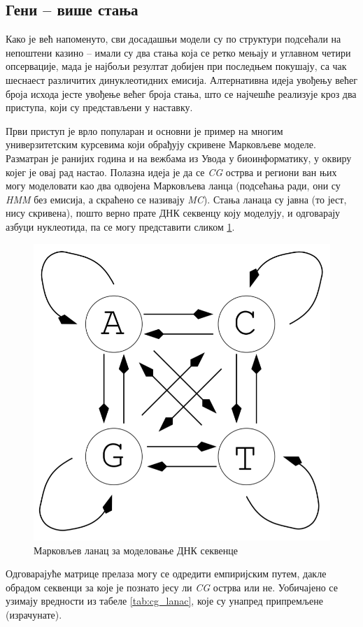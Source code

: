 \documentclass[12pt,oneside]{memoir}
\begin{document}
\begin{CJK}{UTF8}{ipxm}
\section{Гени -- више стања}
Како је већ напоменуто, сви досадашњи модели су по структури подсећали на непоштени казино -- имали су два стања која се ретко мењају и углавном четири опсервације, мада је најбољи резултат добијен при последњем покушају, са чак шеснаест различитих динуклеотидних емисија. Алтернативна идеја увођењу већег броја исхода јесте увођење већег броја стања, што се најчешће реализује кроз два приступа, који су представљени у наставку.

Први приступ је врло популаран и основни је пример на многим универзитетским курсевима који обрађују скривене Марковљеве моделе\cite{holmes2012, huson2020, kellis2021, shamir2009}. Разматран је ранијих година и на вежбама из Увода у биоинформатику, у оквиру којег је овај рад настао. Полазна идеја је да се \textit{CG} острва и региони ван њих могу моделовати као два одвојена Марковљева ланца (подсећања ради, они су \textit{HMM} без емисија, а скраћено се називају \textit{MC}). Стања ланаца су јавна (то јест, нису скривена), пошто верно прате ДНК секвенцу коју моделују, и одговарају азбуци нуклеотида, па се могу представити сликом \ref{fig:cg_lanac}.

\begin{figure}[H]
  \centering
  \includegraphics[width=.5\textwidth]{cg_lanac.png}
  \caption{Марковљев ланац за моделовање ДНК секвенце\cite{huson2020}}
  \label{fig:cg_lanac}
\end{figure}

Одговарајуће матрице прелаза могу се одредити емпиријским путем, дакле обрадом секвенци за које је познато јесу ли \textit{CG} острва или не. Уобичајено се узимају вредности из табеле \ref{tab:cg_lanac}, које су унапред припремљене (израчунате).


\end{CJK}
\end{document}
